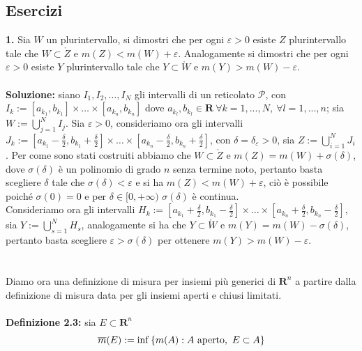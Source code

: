 \documentclass{article}
\begin{document}
\subsection{Esercizi}
\textbf{1.} Sia $W$ un plurintervallo, si dimostri che per ogni $\varepsilon > 0$ esiste $Z$ plurintervallo tale che $W \subset \mathring{Z}$ e $m(Z) < m(W) + \varepsilon$. Analogamente si dimostri che per ogni $\varepsilon > 0$ esiste $Y$ plurintervallo tale che $Y \subset \mathring{W}$ e $m(Y) > m(W) - \varepsilon$. \\ \\
\textbf{Soluzione:} siano $I_1, I_2, \dots , I_N$ gli intervalli di un reticolato $\mathcal{P}$, con $I_k := [a_{k_1}, b_{k_1}] \times \dots \times [a_{k_n}, b_{k_n}]$ dove $a_{k_l}, b_{k_l} \in \mathbf{R} \ \forall k = 1, ... , N, \ \forall l = 1, ... , n$; sia $W := \bigcup_{j = 1}^N I_j$. Sia $\varepsilon > 0$, consideriamo ora gli intervalli $J_k := [a_{k_1} - \frac{\delta}{2}, b_{k_1} + \frac{\delta}{2}] \times \dots \times [a_{k_n} - \frac{\delta}{2}, b_{k_n} + \frac{\delta}{2}]$, con $\delta = \delta_\varepsilon > 0$, sia $Z := \bigcup_{i = 1}^N J_i$. Per come sono stati costruiti abbiamo che $W \subset \mathring{Z}$ e $m(Z) = m(W) + \sigma(\delta)$, dove $\sigma(\delta)$ è un polinomio di grado $n$ senza termine noto, pertanto basta scegliere $\delta$ tale che $\sigma(\delta) < \varepsilon$ e si ha $m(Z) < m(W) + \varepsilon$, ciò è possibile poiché $\sigma(0) = 0$ e per $\delta \in [0, + \infty)$ $\sigma(\delta)$ è continua. \\
Consideriamo ora gli intervalli $H_k := [a_{k_1} + \frac{\delta}{2}, b_{k_1} - \frac{\delta}{2}] \times \dots \times [a_{k_n} + \frac{\delta}{2}, b_{k_n} - \frac{\delta}{2}]$, sia $Y := \bigcup_{s = 1}^N H_s$, analogamente si ha che $Y \subset \mathring{W}$ e $m(Y) = m(W) - \sigma(\delta)$, pertanto basta scegliere $\varepsilon > \sigma(\delta)$ per ottenere $m(Y) > m(W) - \varepsilon$. \\ \\ \\
Diamo ora una definizione di misura per insiemi più generici di $\mathbf{R}^n$ a partire dalla definizione di misura data per gli insiemi aperti e chiusi limitati. \\ \\
\textbf{Definizione 2.3:} sia $E \subset \mathbf{R}^n$
\begin{equation}
    \overline{m}(E) := \inf\left\{ m(A) : A \text{ aperto}, \ E \subset A \right\} \notag
\end{equation}
\end{document}
